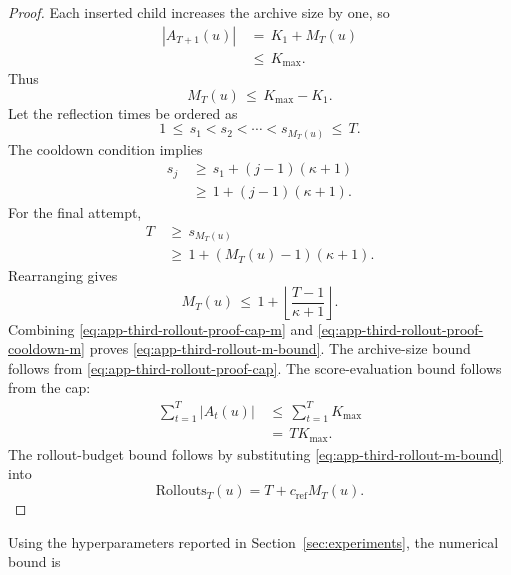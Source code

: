\documentclass{article} %
\begin{document}
\begin{proof}
Each inserted child increases the archive size by one, so
\begin{align}
\label{eq:app-third-rollout-proof-cap}
|A_{T+1}(u)|
&\,=\,
K_1+M_T(u)
\\
&\,\le\,
K_{\max}.
\end{align}
Thus
\begin{equation}
\label{eq:app-third-rollout-proof-cap-m}
M_T(u)
\,\le\,
K_{\max}-K_1.
\end{equation}
Let the reflection times be ordered as
\begin{equation}
\label{eq:app-third-rollout-proof-times}
1
\,\le\,
s_1
<
s_2
<
\cdots
<
s_{M_T(u)}
\,\le\,
T.
\end{equation}
The cooldown condition implies
\begin{align}
\label{eq:app-third-rollout-proof-spacing}
s_j
&\,\ge\,
s_1+(j-1)(\kappa+1)
\\
&\,\ge\,
1+(j-1)(\kappa+1).
\end{align}
For the final attempt,
\begin{align}
\label{eq:app-third-rollout-proof-final-time}
T
&\,\ge\,
s_{M_T(u)}
\\
&\,\ge\,
1+(M_T(u)-1)(\kappa+1).
\end{align}
Rearranging gives
\begin{equation}
\label{eq:app-third-rollout-proof-cooldown-m}
M_T(u)
\,\le\,
1+\left\lfloor\frac{T-1}{\kappa+1}\right\rfloor.
\end{equation}
Combining \eqref{eq:app-third-rollout-proof-cap-m} and \eqref{eq:app-third-rollout-proof-cooldown-m} proves \eqref{eq:app-third-rollout-m-bound}.  The archive-size bound follows from \eqref{eq:app-third-rollout-proof-cap}.  The score-evaluation bound follows from the cap:
\begin{align}
\label{eq:app-third-rollout-proof-score}
\sum_{t=1}^{T}|A_t(u)|
&\,\le\,
\sum_{t=1}^{T}K_{\max}
\\
&\,=\,
T K_{\max}.
\end{align}
The rollout-budget bound follows by substituting \eqref{eq:app-third-rollout-m-bound} into
\begin{equation}
\label{eq:app-third-rollout-proof-budget}
\mathrm{Rollouts}_T(u)
=
T+c_{\mathrm{ref}}M_T(u).
\end{equation}
\end{proof}

Using the hyperparameters reported in Section~\ref{sec:experiments}, the numerical bound is
\end{document}
